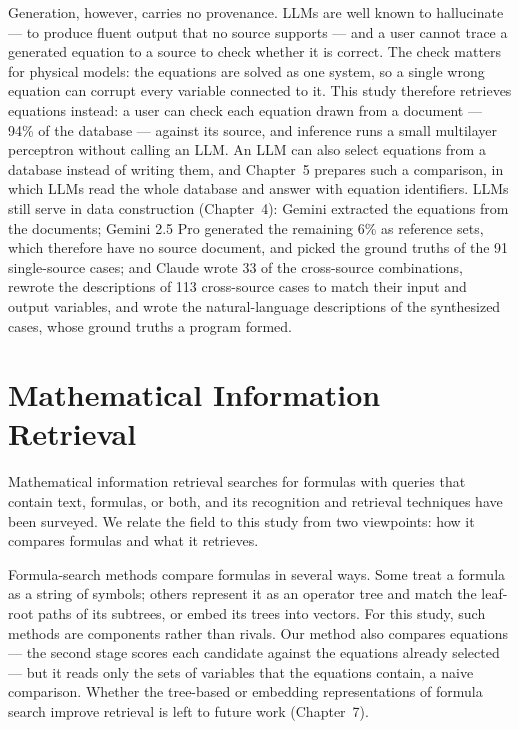 Generation, however, carries no provenance. LLMs are well known to hallucinate --- to produce
fluent output that no source supports\cite{Hallucination} --- and a user cannot trace a generated
equation to a source to check whether it is correct. The check matters for physical models: the
equations are solved as one system, so a single wrong equation can corrupt every variable connected
to it. This study therefore retrieves equations instead: a user can check each equation drawn
from a document --- 94\% of the database --- against its source, and inference runs a small
multilayer perceptron without calling an LLM. An LLM can also select equations from a database
instead of writing them, and Chapter~5 prepares such a comparison, in which LLMs read the whole
database and answer with equation identifiers. LLMs still serve in data construction (Chapter~4):
Gemini extracted the equations from the documents; Gemini 2.5 Pro generated the remaining 6\% as
reference sets, which therefore have no source document, and picked the ground truths of the 91
single-source cases; and Claude wrote 33 of the cross-source combinations, rewrote the descriptions
of 113 cross-source cases to match their input and output variables, and wrote the
natural-language descriptions of the synthesized cases, whose ground truths a program formed.

\section{Mathematical Information Retrieval}
\label{sec:rw-mathir}

Mathematical information retrieval searches for formulas with queries that contain text, formulas,
or both, and its recognition and retrieval techniques have been surveyed\cite{MathSurvey}. We relate
the field to this study from two viewpoints: how it compares formulas and what it retrieves.

Formula-search methods compare formulas in several ways. Some treat a formula as a string of
symbols; others represent it as an operator tree and match the leaf-root paths of its
subtrees\cite{Approach0}, or embed its trees into vectors\cite{TangentCFT}. For this study, such
methods are components rather than rivals. Our method also compares equations --- the second stage
scores each candidate against the equations already selected --- but it reads only the sets of
variables that the equations contain, a naive comparison. Whether the tree-based or embedding
representations of formula search improve retrieval is left to future work (Chapter~7).

